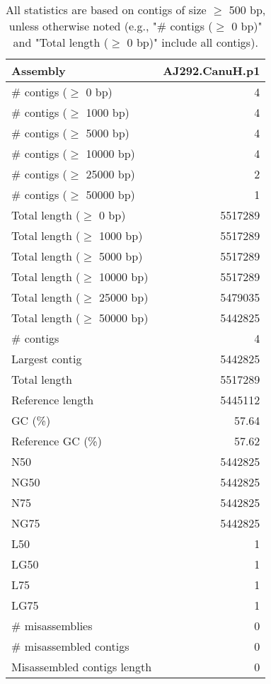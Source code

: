 \documentclass[12pt,a4paper]{article}
\begin{document}
\begin{table}[ht]
\begin{center}
\caption{All statistics are based on contigs of size $\geq$ 500 bp, unless otherwise noted (e.g., "\# contigs ($\geq$ 0 bp)" and "Total length ($\geq$ 0 bp)" include all contigs).}
\begin{tabular}{|l*{1}{|r}|}
\hline
Assembly & AJ292.CanuH.p1 \\ \hline
\# contigs ($\geq$ 0 bp) & 4 \\ \hline
\# contigs ($\geq$ 1000 bp) & 4 \\ \hline
\# contigs ($\geq$ 5000 bp) & 4 \\ \hline
\# contigs ($\geq$ 10000 bp) & 4 \\ \hline
\# contigs ($\geq$ 25000 bp) & 2 \\ \hline
\# contigs ($\geq$ 50000 bp) & 1 \\ \hline
Total length ($\geq$ 0 bp) & 5517289 \\ \hline
Total length ($\geq$ 1000 bp) & 5517289 \\ \hline
Total length ($\geq$ 5000 bp) & 5517289 \\ \hline
Total length ($\geq$ 10000 bp) & 5517289 \\ \hline
Total length ($\geq$ 25000 bp) & 5479035 \\ \hline
Total length ($\geq$ 50000 bp) & 5442825 \\ \hline
\# contigs & 4 \\ \hline
Largest contig & 5442825 \\ \hline
Total length & 5517289 \\ \hline
Reference length & 5445112 \\ \hline
GC (\%) & 57.64 \\ \hline
Reference GC (\%) & 57.62 \\ \hline
N50 & 5442825 \\ \hline
NG50 & 5442825 \\ \hline
N75 & 5442825 \\ \hline
NG75 & 5442825 \\ \hline
L50 & 1 \\ \hline
LG50 & 1 \\ \hline
L75 & 1 \\ \hline
LG75 & 1 \\ \hline
\# misassemblies & 0 \\ \hline
\# misassembled contigs & 0 \\ \hline
Misassembled contigs length & 0 \\ \hline

\end{tabular}
\end{center}
\end{table}
\end{document}
